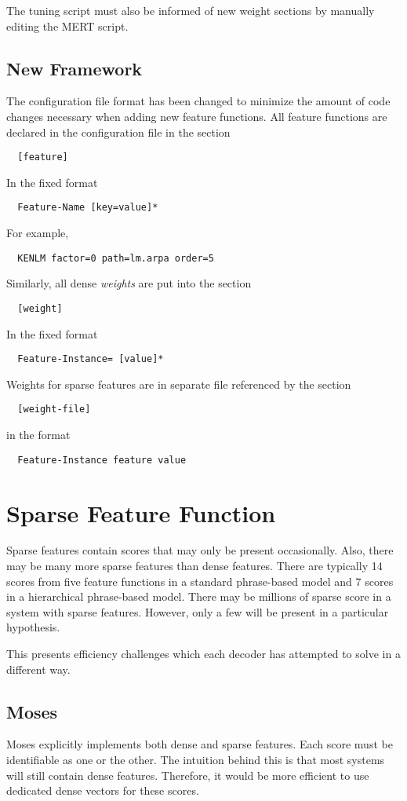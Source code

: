 \documentclass{pbml}
\begin{document}
The tuning script must also be informed of new weight sections by manually editing the MERT script.

\subsection{New Framework}
The configuration file format has been changed to minimize the amount of code changes necessary when adding new feature functions. All feature functions are declared in the configuration file in the section
\begin{verbatim}
  [feature]
\end{verbatim}
In the fixed format
\begin{verbatim}
  Feature-Name [key=value]*
\end{verbatim}
For example,
\begin{verbatim}
  KENLM factor=0 path=lm.arpa order=5
\end{verbatim}
Similarly, all dense \emph{weights} are put into the section
\begin{verbatim}
  [weight]
\end{verbatim}
In the fixed format
\begin{verbatim}
  Feature-Instance= [value]*
\end{verbatim}
Weights for sparse features are in separate file referenced by the section
\begin{verbatim}
  [weight-file]
\end{verbatim}
in the format
\begin{verbatim}
  Feature-Instance feature value
\end{verbatim}
  
\section{Sparse Feature Function}

Sparse features contain scores that may only be present occasionally. Also, there may be many more sparse features than dense features. There are typically 14 scores from five feature functions in a standard phrase-based model and 7 scores in a hierarchical phrase-based model. There may be millions of sparse score in a system with sparse features. However, only a few will be present in a particular hypothesis.

This presents efficiency challenges which each decoder has attempted to solve in a different way.

\subsection{Moses}
Moses explicitly implements both dense and sparse features. Each score must be identifiable as one or the other.
The intuition behind this is that most systems will still contain dense features. Therefore, it would be more efficient to use dedicated dense vectors for these scores.
\end{document}
